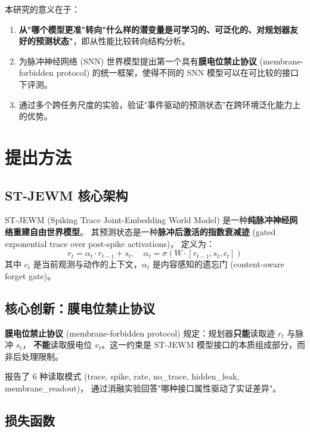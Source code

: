 \documentclass[11pt,a4paper]{article}
\begin{document}
本研究的意义在于：
\begin{enumerate}
    \item \textbf{从"哪个模型更准"转向"什么样的潜变量是可学习的、可泛化的、对规划器友好的预测状态"}，即从性能比较转向结构分析。
    \item 为脉冲神经网络 (SNN) 世界模型提出第一个具有\textbf{膜电位禁止协议} (membrane-forbidden protocol) 的统一框架，使得不同的 SNN 模型可以在可比较的接口下评测。
    \item 通过多个跨任务尺度的实验，验证"事件驱动的预测状态"在跨环境泛化能力上的优势。
\end{enumerate}

\section{提出方法}

\subsection{ST-JEWM 核心架构}

ST-JEWM (Spiking Trace Joint-Embedding World Model) 是一种\textbf{纯脉冲神经网络重建自由世界模型}。
其预测状态是一种\textbf{脉冲后激活的指数衰减迹} (gated exponential trace over post-spike activations)，
定义为：
\begin{equation}
    r_t = \alpha_t \cdot r_{t-1} + s_t, \quad \alpha_t = \sigma(W \cdot [r_{t-1}, s_t, c_t])
\end{equation}
其中 $c_t$ 是当前观测与动作的上下文，$\alpha_t$ 是内容感知的遗忘门 (content-aware forget gate)。

\subsection{核心创新：膜电位禁止协议}

\textbf{膜电位禁止协议} (membrane-forbidden protocol) 规定：规划器\textbf{只能}读取迹 $r_t$ 与脉冲 $s_t$，
\textbf{不能}读取膜电位 $v_t$。这一约束是 ST-JEWM 模型接口的本质组成部分，而非后处理限制。

报告了 6 种读取模式 (trace, spike, rate, no\_trace, hidden\_leak, membrane\_readout)，
通过消融实验回答"哪种接口属性驱动了实证差异"。

\subsection{损失函数}
\end{document}
